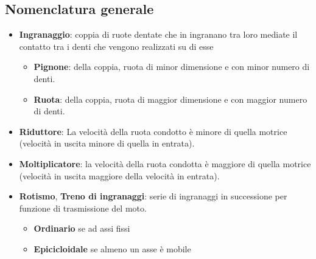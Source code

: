 \documentclass[a4paper, 15pt]{article}
\begin{document}
\subsection{Nomenclatura generale}
\begin{adjustwidth}{2in}{}
	\begin{itemize}
		\item \textbf{Ingranaggio}: coppia di ruote dentate che in ingranano tra loro mediate il contatto tra i denti che vengono realizzati su di esse
		\begin{itemize}
			\item \textbf{Pignone}: della coppia, ruota di minor dimensione e con minor numero di denti.
			\item \textbf{Ruota}: della coppia, ruota di maggior dimensione e con maggior numero di denti.
		\end{itemize}
		\item \textbf{Riduttore}: La velocità della ruota condotto è minore di quella motrice (velocità in uscita minore di quella in entrata).
		\item \textbf{Moltiplicatore}: la velocità della ruota condotta è maggiore di quella motrice (velocità in uscita maggiore della velocità in entrata).
\newpage
		\item \textbf{Rotismo}, \textbf{Treno di ingranaggi}: serie di ingranaggi in successione per funzione di trasmissione del moto.
		\begin{itemize}
			\item \textbf{Ordinario} se ad assi fissi
			\item \textbf{Epicicloidale} se almeno un asse è mobile
		\end{itemize}
	\end{itemize}
\end{adjustwidth}
\end{document}

